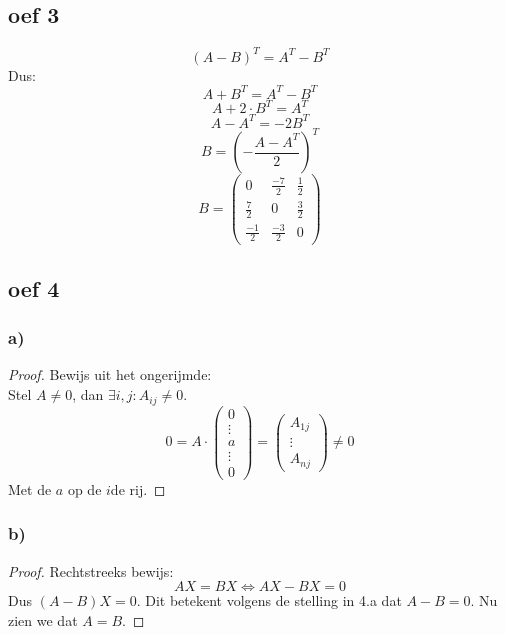 \documentclass[lineaire_algebra_oplossingen.tex]{subfiles}
\begin{document}
\subsection{oef 3}
$$(A - B)^T = A^T - B^T$$
Dus:
$$A+B^T = A^T - B^T$$
$$A+2\cdot B^T = A^T$$
$$A - A^T = -2B^T$$
$$B = \left(-\frac{A - A^T}{2}\right)^T$$
$$ B = 
\begin{pmatrix}
0 & \frac{-7}{2} & \frac{1}{2}\\
\frac{7}{2} & 0 & \frac{3}{2}\\
\frac{-1}{2} & \frac{-3}{2} & 0
\end{pmatrix}
$$
\subsection{oef 4}
\subsubsection*{a)}
\begin{proof}
Bewijs uit het ongerijmde:\\
Stel $A \neq 0$, dan $\exists i, j: A_{ij} \neq 0$.
\[
0= A \cdot
\begin{pmatrix}
0\\\vdots\\a\\\vdots\\0
\end{pmatrix}
=
\begin{pmatrix}
A_{1j}\\\vdots\\A_{nj}
\end{pmatrix}
\neq 0
\]
Met de $a$ op de $i$de rij.
\end{proof}

\subsubsection*{b)}
\begin{proof}
Rechtstreeks bewijs:\\
\[
AX=BX \Leftrightarrow AX - BX=0
\]
Dus $(A-B)X=0$.
Dit betekent volgens de stelling in 4.a dat $A-B=0$.
Nu zien we dat $A=B$.
\end{proof}
\end{document}
